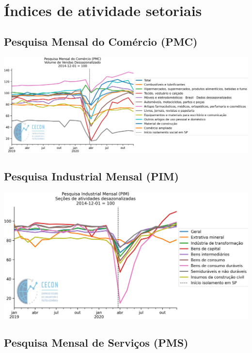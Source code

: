 \documentclass{SelfArx}
\begin{document}
\section*{Índices de atividade setoriais}
\label{sec:orge1da2de}


\subsection*{Pesquisa Mensal do Comércio (PMC)}
\label{sec:orgede9753}

\begin{center}
\includegraphics[width=.9\linewidth]{./figs/Setoriais/PMC_IBGE.png}
\end{center}


\subsection*{Pesquisa Industrial Mensal (PIM)}
\label{sec:orgd418176}

\begin{center}
\includegraphics[width=.9\linewidth]{./figs/Setoriais/PIM_IBGE.png}
\end{center}


\subsection*{Pesquisa Mensal de Serviços (PMS)}
\label{sec:org92c7ff2}
\end{document}
